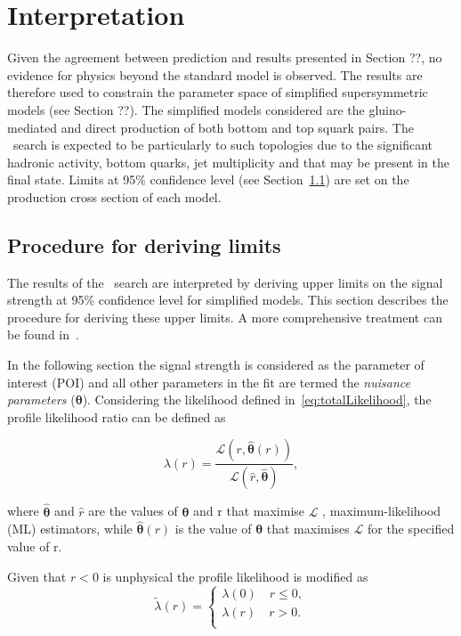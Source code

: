 \clearpage
\section{Interpretation}

Given the agreement between prediction and results presented in Section ??, no evidence
for physics beyond the standard model is observed. The results are therefore used to constrain
the parameter space of simplified supersymmetric models (see Section ??). The simplified 
models considered are the gluino-mediated and direct production of
both bottom and top squark pairs. The \alphat~search is expected to be particularly to
such topologies due to the significant hadronic activity, bottom quarks, jet multiplicity
and \mht that may be present in the final state. Limits at 95\% confidence level (see Section~\ref{sec:limits}) 
are set on the production cross section of each model.

\subsection{Procedure for deriving limits}
\label{sec:limits}
The results of the \alphat~search are interpreted by deriving upper limits on the signal strength
at 95\% confidence level for simplified models. This section describes the procedure for deriving
these upper limits. A more comprehensive treatment can be found in~\cite{asymp}.

In the following section the signal strength is considered as the parameter of interest (POI)
and all other parameters in the fit are termed the \emph{nuisance parameters} ($\boldsymbol{\theta}$). Considering
the likelihood defined in~\ref{eq:totalLikelihood}, the profile likelihood ratio can be defined as

\begin{equation}
\label{eq:profile}
\lambda(r) = \frac{\mathcal{L}(r,\hat{\boldsymbol{\theta}}(r))}{\mathcal{L}(\hat{r},\hat{\boldsymbol{\theta}})},
\end{equation}

where $\hat{\boldsymbol{\theta}}$ and $\hat{r}$ are the values of $\boldsymbol{\theta}$ and r that maximise $\mathcal{L}$
, maximum-likelihood (ML) estimators, while $\hat{\boldsymbol{\theta}}(r)$ is the value
of $\boldsymbol{\theta}$ that maximises $\mathcal{L}$ for the specified value of r. 

Given that $r < 0$ is unphysical the profile likelihood is modified as
\begin{equation}
\label{eq:profileNew}
\tilde{\lambda}(r) = 
\begin{cases}
\lambda(0)\quad r \le 0, \\ 
\lambda(r)\quad r > 0. \\ 
\end{cases}
\end{equation}

